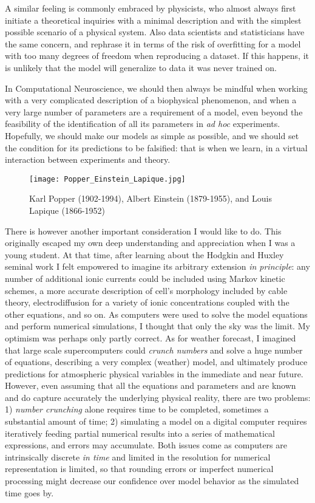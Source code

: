 A similar feeling is commonly embraced by physicists, who almost always first initiate a theoretical inquiries with a minimal description and with the simplest possible scenario of a physical system. Also data scientists and statisticians have the same concern, and rephrase it in terms of the risk of overfitting for a model with too many degrees of freedom when reproducing a dataset. If this happens, it is unlikely that the model will generalize to data it was never trained on.

In Computational Neuroscience, we should then always be mindful when working with a very complicated description of a biophysical phenomenon, and when a very large number of parameters are a requirement of a model, even beyond the feasibility of the identification of all its parameters in \textit{ad hoc} experiments. Hopefully, we should make our models as simple as possible, and we should set the condition for its predictions to be falsified: that is when we learn, in a virtual interaction between experiments and theory.

\begin{figure}[t]
	\sidecaption[t]
	\centering
	\texttt{[image: Popper\_Einstein\_Lapique.jpg]}
	\caption{Karl Popper (1902-1994), Albert Einstein (1879-1955), and Louis Lapique (1866-1952)}
	\label{fig:PopperEinsteinLapique}       %
	\end{figure}



There is however another important consideration I would like to do. This originally escaped my own deep understanding and appreciation when I was a young student. At that time, after learning about the Hodgkin and Huxley seminal work I felt empowered to imagine its arbitrary extension \textit{in principle}: any number of additional ionic currents could be included using Markov kinetic schemes, a more accurate description of cell's morphology included by cable theory, electrodiffusion for a variety of ionic concentrations coupled with the other equations, and so on. As computers were used to solve the model equations and perform numerical simulations, I thought that only the sky was the limit. My optimism was perhaps only partly correct. As for weather forecast, I imagined that large scale supercomputers could \textit{crunch numbers} and solve a huge number of equations, describing a very complex (weather) model, and ultimately produce predictions for atmospheric physical variables in the immediate and near future. However, even assuming that all the equations and parameters and are known and do capture accurately the underlying physical reality, there are two problems: 1) \textit{number crunching} alone requires time to be completed, sometimes a substantial amount of time; 2) simulating a model on a digital computer requires iteratively feeding partial numerical results into a series of mathematical expressions, and errors may accumulate. Both issues come as computers are intrinsically discrete \textit{in time} and limited in the resolution for numerical representation is limited, so that rounding errors or imperfect numerical processing might decrease our confidence over model behavior as the simulated time goes by.

